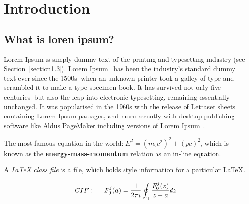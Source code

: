 
\ifpdf
\graphicspath{{Chapter1/figs/Raster/}{Chapter1/figs/PDF/}{Chapter1/figs/}}
\else
\graphicspath{{Chapter1/figs/Vector/}{Chapter1/figs/}}
\fi


\chapter{Introduction}\label{intro}

\section{What is loren ipsum?}\label{intro:what}
  
  Lorem Ipsum is simply dummy text of the printing and typesetting industry (see 
  Section~\ref{section1.3}). Lorem Ipsum~\citep{Aup91} has been the industry's 
  standard dummy text ever since the 1500s, when an unknown printer took a galley 
  of type and scrambled it to make a type specimen book. It has survived not only 
  five centuries, but also the leap into electronic typesetting, remaining 
  essentially unchanged. It was popularised in the 1960s with the release of 
  Letraset sheets containing Lorem Ipsum passages, and more recently with desktop 
  publishing software like Aldus PageMaker including versions of Lorem 
  Ipsum~\citep{AAB95,Con90,LM65}.

  The most famous equation in the world: $E^2 = (m_0c^2)^2 + (pc)^2$, which is 
  known as the \textbf{energy-mass-momentum} relation as an in-line equation.

  A {\em \LaTeX{} class file} is a file, which holds style information for a particular \LaTeX{}.


  \begin{align}
  CIF: \hspace*{5mm}F_0^j(a) = \frac{1}{2\pi \iota} \oint_{\gamma} \frac{F_0^j(z)}{z - a} dz
  \end{align}

